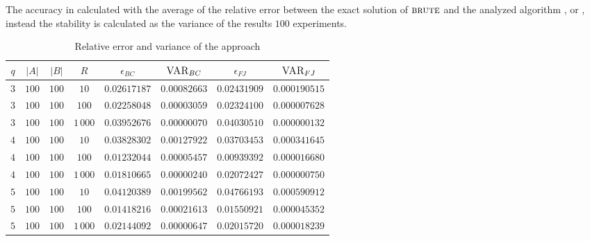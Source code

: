 	The accuracy in calculated with the average of the relative error between the exact solution of $\textsc{brute}$ and the analyzed algorithm \fcount, \fsamp or \base, instead the stability is calculated as the variance of the results $100$ experiments.

	\begin{table}[h]
		\centering
		\label{my-label}
		\begin{tabular}{|c|c|c|c|c|c|c|c|}
			\hline
			$q$ & $|A|$ & $|B|$ & $R$      & $\epsilon_{BC}$ & $\textsc{VAR}_{BC}$ & $\epsilon_{FJ}$ & $\textsc{VAR}_{FJ}$ \\ \hline
			$3$ & $100$ & $100$ & $10$     & $0.02617187$ & $0.00082663$ & $0.02431909$ & $0.000190515$ \\ \hline
			$3$ & $100$ & $100$ & $100$    & $0.02258048$ & $0.00003059$ & $0.02324100$ & $0.000007628$ \\ \hline
			$3$ & $100$ & $100$ & $1\,000$ & $0.03952676$ & $0.00000070$ & $0.04030510$ & $0.000000132$ \\ \hline
			$4$ & $100$ & $100$ & $10$     & $0.03828302$ & $0.00127922$ & $0.03703453$ & $0.000341645$ \\ \hline
			$4$ & $100$ & $100$ & $100$    & $0.01232044$ & $0.00005457$ & $0.00939392$ & $0.000016680$ \\ \hline
			$4$ & $100$ & $100$ & $1\,000$ & $0.01810665$ & $0.00000240$ & $0.02072427$ & $0.000000750$ \\ \hline
			$5$ & $100$ & $100$ & $10$     & $0.04120389$ & $0.00199562$ & $0.04766193$ & $0.000590912$ \\ \hline
			$5$ & $100$ & $100$ & $100$    & $0.01418216$ & $0.00021613$ & $0.01550921$ & $0.000045352$ \\ \hline
			$5$ & $100$ & $100$ & $1\,000$ & $0.02144092$ & $0.00000647$ & $0.02015720$ & $0.000018239$ \\ \hline
			
		\end{tabular}
		\caption{Relative error and variance of the \fcount approach}	
	\end{table}

